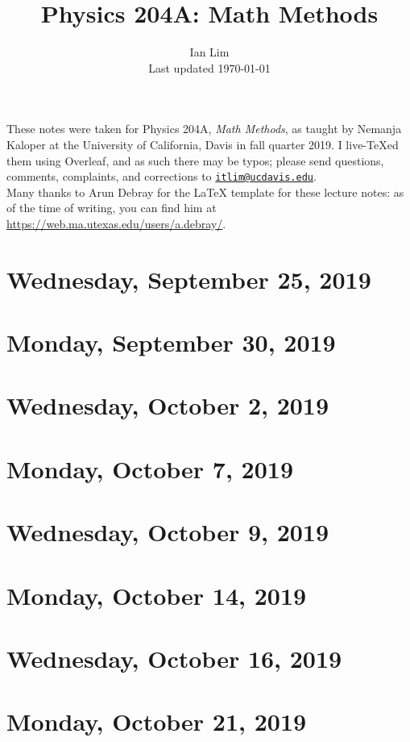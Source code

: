 \documentclass{../mynotes}
\begin{document}
\title{Physics 204A: Math Methods}
\author{Ian Lim\\ Last updated \today}
\maketitle
{\small\noindent These notes were taken for Physics 204A, \emph{Math Methods}, as taught by Nemanja Kaloper at the University of California, Davis in fall quarter 2019. I live-\TeX ed them using Overleaf, and as such there may be typos; please send questions, comments, complaints, and corrections to 
\href{mailto:itlim@ucdavis.edu?subject=204A\%20Lecture\%20Notes}{\texttt{itlim@ucdavis.edu}}.\\
Many thanks to Arun Debray for the {\LaTeX} template for these lecture notes: as of the time of writing, you can find him at \url{https://web.ma.utexas.edu/users/a.debray/}.}

\tableofcontents

\section{Wednesday, September 25, 2019}
	
	

\section{Monday, September 30, 2019}
    
\section{Wednesday, October 2, 2019}
    
    
\section{Monday, October 7, 2019}
	
	
\section{Wednesday, October 9, 2019}
    

\section{Monday, October 14, 2019}
    
\section{Wednesday, October 16, 2019}
    

\section{Monday, October 21, 2019}
    
\end{document}
